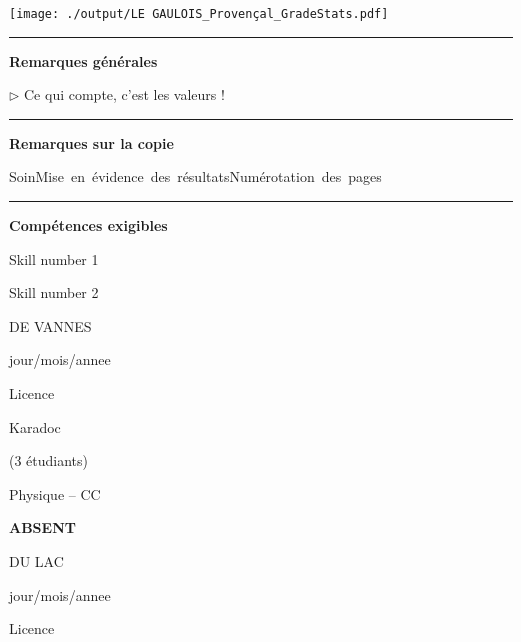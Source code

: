 \documentclass[12pt, a4paper]{article}
\begin{document}
\begin{center}
\texttt{[image: ./output/LE GAULOIS\_Provençal\_GradeStats.pdf]}\end{center}


\noindent\rule{\linewidth}{.7pt}\begin{center}{\large\bf Remarques générales}\end{center}

$\triangleright$\xspace Ce qui compte, c’est les valeurs !


\noindent\rule{\linewidth}{.7pt}\begin{center}{\large\bf Remarques sur la copie}\end{center}

\begin{center}
\noindent \mbox{Soin\xspace\xspace\color{DarkRed}\faFrownO\color{black}}\hfill \mbox{Mise en évidence des résultats\xspace\xspace\color{DarkRed}\faFrownO\color{black}}\hfill \mbox{Numérotation des pages\xspace\xspace\color{DarkGreen}\faSmileO\color{black}}\hfill 
\end{center}


\noindent\rule{\linewidth}{.7pt}\begin{center}{\large\bf Compétences exigibles}\end{center}

\begin{minipage}[c]{0.4\linewidth}\centering
Skill number 1\xspace\xspace\color{DarkRed}\faFrownO\color{black}
\end{minipage}\hfill
\begin{minipage}[c]{0.4\linewidth}\centering
Skill number 2\xspace\xspace\color{DarkRed}\faFrownO\color{black}
\end{minipage}
\newpage
\pagestyle{empty}
\noindent\begin{minipage}[c]{0.31\linewidth}\noindent DE VANNES\end{minipage}\hfill
\begin{minipage}[c]{0.31\linewidth}\centering jour/mois/annee \end{minipage}\hfill
\begin{minipage}[c]{0.31\linewidth}\hfill Licence \end{minipage}\hfill

\noindent\begin{minipage}[c]{0.31\linewidth}\noindent Karadoc\end{minipage}\hfill
\begin{minipage}[c]{0.31\linewidth}\hfill(3 étudiants)\end{minipage}
\begin{center} Physique -- CC\bigskip

{\Large\bf ABSENT}\end{center}\newpage
\pagestyle{empty}
\noindent\begin{minipage}[c]{0.31\linewidth}\noindent DU LAC\end{minipage}\hfill
\begin{minipage}[c]{0.31\linewidth}\centering jour/mois/annee \end{minipage}\hfill
\begin{minipage}[c]{0.31\linewidth}\hfill Licence \end{minipage}\hfill
\end{document}
